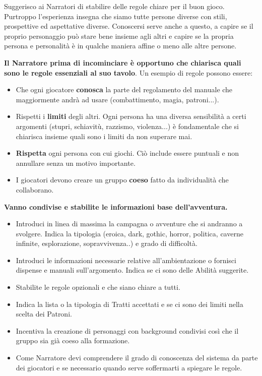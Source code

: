 \begin{multicols}{2}
Suggerisco ai Narratori di stabilire delle regole chiare per il buon gioco. Purtroppo l'esperienza insegna che siamo tutte persone diverse con stili, prospettive ed aspettative diverse. Conoscersi serve anche a questo, a capire se il proprio personaggio può stare bene insieme agli altri e capire se la propria persona e personalità è in qualche maniera affine o meno alle altre persone.

\textbf{Il Narratore prima di incominciare è opportuno che chiarisca quali sono le regole essenziali al suo tavolo}. Un esempio di regole possono essere:

\begin{itemize}[leftmargin=*] \setlength{\itemsep}{0pt}

\item Che ogni giocatore \textbf{conosca} la parte del regolamento del manuale che maggiormente andrà ad usare (combattimento, magia, patroni...).
\item Rispetti i \textbf{limiti} degli altri. Ogni persona ha una diversa sensibilità a certi argomenti (stupri, schiavitù, razzismo, violenza...) è fondamentale che si chiarisca insieme quali sono i limiti da non superare mai.
\item \textbf{Rispetta} ogni persona con cui giochi. Ciò include essere puntuali e non annullare senza un motivo importante.
\item I giocatori devono creare un gruppo \textbf{coeso} fatto da individualità che collaborano.
\end{itemize}

\textbf{Vanno condivise e stabilite le informazioni base dell'avventura.}

\medskip

\begin{itemize}[leftmargin=*] \setlength{\itemsep}{0pt}
\item Introduci in linea di massima la campagna o avventure che si andranno a svolgere. Indica la tipologia (eroica, dark, gothic, horror, politica, caverne infinite, esplorazione, sopravvivenza..) e grado di difficoltà.
\item Introduci le informazioni necessarie relative all'ambientazione o fornisci dispense e manuali sull'argomento. Indica se ci sono delle Abilità suggerite.
\item Stabilite le regole opzionali e che siano chiare a tutti.
\item Indica la lista o la tipologia di Tratti accettati e se ci sono dei limiti nella scelta dei Patroni.
\item Incentiva la creazione di personaggi con background condivisi così che il gruppo sia già coeso alla formazione.
\item Come Narratore devi comprendere il grado di conoscenza del sistema da parte dei giocatori e se necessario quando serve soffermarti a spiegare le regole.
\end{itemize}


\end{multicols}
